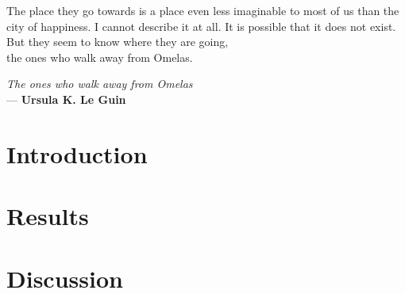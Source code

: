 



\frontmatter {}  %
    
    \epigraph{The place they go towards is a place even less imaginable to most of us than the city of happiness. I cannot describe it at all. It is possible that it does not exist. \\ But they seem to know where they are going, \\ the ones who walk away from Omelas.}{\textit{The ones who walk away from Omelas} \\ --- \textbf{Ursula K. Le Guin}}
    
    
    
     \tableofcontents {}

\mainmatter
    \part{Introduction}\label{introduction}
        
        
    \part{Results}\label{results}
        
        
        
    \part{Discussion}\label{discussion}
        
        

\backmatter
    \listoffigures
    
    
    


